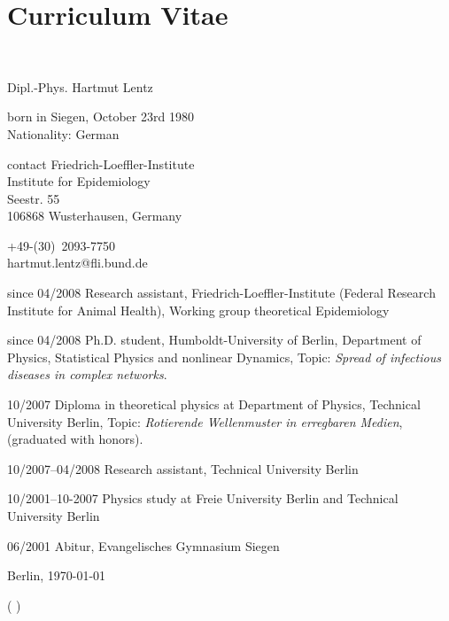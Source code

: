 \chapter*{Curriculum Vitae}

\begin{cv}{~}
  
\begin{cvlist}{\color{Steel}{Personal information}}
  \item Dipl.-Phys. Hartmut Lentz
    \item born in Siegen, October 23rd 1980\\
	Nationality: German
    \item[contact] Friedrich-Loeffler-Institute\\
    Institute for Epidemiology\\
    Seestr. 55\\
    106868 Wusterhausen, Germany
  \item +49-(30)~2093-7750\\
   hartmut.lentz@fli.bund.de	

\end{cvlist}

  \begin{cvlist}{\color{Steel}{Education and job history}}
  \item[since 04/2008] Research assistant, Friedrich-Loeffler-Institute (Federal Research Institute for Animal Health), Working group theoretical Epidemiology
   \item[since 04/2008] Ph.D. student, Humboldt-University of Berlin, Department of
Physics, Statistical Physics and nonlinear Dynamics, Topic: \emph{Spread of infectious diseases in complex networks}.
  \item[10/2007] Diploma in theoretical physics at Department of Physics, Technical University Berlin, Topic: \emph{Rotierende Wellenmuster in erregbaren Medien}, (graduated with honors).
  \item[10/2007--04/2008] Research assistant, Technical University Berlin
  \item[10/2001--10-2007] Physics study at Freie University Berlin and Technical University Berlin
  \item[06/2001] Abitur, Evangelisches Gymnasium Siegen
  \end{cvlist}

  \date{}
\end{cv}

\noindent Berlin, \today   %

\par\hspace{8cm}  ( \authorfirstname \authorsurname)
